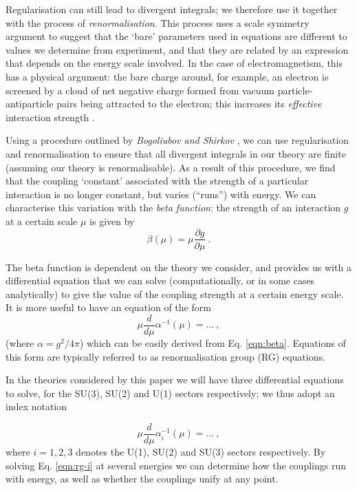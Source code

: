 \documentclass[12pt,a4paper,oneside]{article}
\begin{document}
Regularisation can still lead to divergent integrals; we therefore use it together with the process of \textit{renormalisation}. This process uses a scale symmetry argument to suggest that the `bare' parameters used in equations are different to values we determine from experiment, and that they are related by an expression that depends on the energy scale involved. In the case of electromagnetism, this has a physical argument: the bare charge around, for example, an electron is screened by a cloud of net negative charge formed from vacuum particle-antiparticle pairs being attracted to the electron; this increases its \textit{effective } interaction strength \cite{renorm-2}.

Using a procedure outlined by \textit{Bogoliubov and Shirkov} \cite{bogoliubov}, we can use regularisation and renormalisation to ensure that all divergent integrals in our theory are finite (assuming our theory is renormalisable). As a result of this procedure, we find that the coupling `constant' associated with the strength of a particular interaction is no longer constant, but varies (``runs'') with energy. We can characterise this variation with the \textit{beta function}: the strength of an interaction $g$ at a certain scale $\mu$ is given by
\begin{equation}
\beta (\mu) = \mu \frac{\partial g}{\partial \mu} \:.
\label{eqn:beta}
\end{equation}

The beta function is dependent on the theory we consider, and provides us with a differential equation that we can solve (computationally, or in some cases analytically) to give the value of the coupling strength at a certain energy scale. It is more useful to have an equation of the form
\[
\mu \frac{d}{d \mu} \alpha^{-1} (\mu) = \ldots \:,
\]
(where $\alpha = g^2 / 4 \pi$) which can be easily derived from Eq. \ref{eqn:beta}. Equations of this form are typically referred to as renormalisation group (RG) equations.

In the theories considered by this paper we will have three differential equations to solve, for the SU(3), SU(2) and U(1) sectors respectively; we thus adopt an index notation

\begin{equation}
\mu \frac{d}{d \mu} \alpha^{-1}_i (\mu) = \ldots \:,
\label{eqn:rg-i}
\end{equation}
where $i = 1, 2, 3$ denotes the U(1), SU(2) and SU(3) sectors respectively. By solving Eq. \ref{eqn:rg-i} at several energies we can determine how the couplings run with energy, as well as whether the couplings unify at any point.
\end{document}
